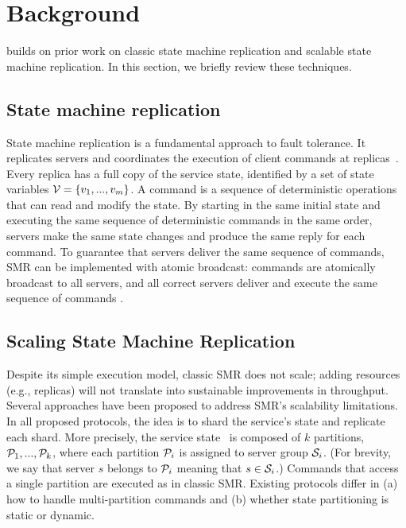 \section{Background}
\label{sec:background}


\dynastar builds on prior work on classic state machine replication and scalable state machine replication.
In this section, we briefly review these techniques. 

\subsection{State machine replication}
\label{sec:smr}

State machine replication is a fundamental approach to fault tolerance.
It replicates servers and coordinates the execution of client commands at replicas~\cite{Lam78,Sch90}. 
Every replica has a full copy of the service state, identified by a set of state variables $\mathcal{V} = \{v_1, ..., v_m\}$.
A command is a sequence of deterministic operations that can read and modify the state.
By starting in the same initial state and executing the same sequence of deterministic commands in the same order, servers make the same state changes and produce the same reply for each command. 
To guarantee that servers deliver the same sequence of commands, SMR can be implemented with atomic broadcast: commands are atomically broadcast to all servers, and all correct servers deliver and execute the same sequence of commands \cite{BJ87b,DSU04}.


\subsection{Scaling State Machine Replication}

Despite its simple execution model, classic SMR does not scale; adding resources (e.g., replicas) will not translate into sustainable improvements in throughput. 
Several approaches have been proposed to address SMR's scalability limitations.
In all proposed protocols, the idea is to shard the service's state and replicate each shard.
More precisely, the service state \vvt\ is composed of $k$ partitions, $\mathcal{P}_1, ..., \mathcal{P}_k$, where each partition $\mathcal{P}_i$ is assigned to server group $\mathcal{S}_i$. 
(For brevity, we say that server $s$ belongs to $\mathcal{P}_i$ meaning that $s \in \mathcal{S}_i$.)
%
Commands that access a single partition are executed as in classic SMR.
Existing protocols differ in (a) how to handle multi-partition commands and (b) whether state partitioning is static or dynamic.

